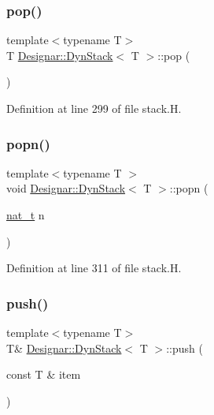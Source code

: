 \subsubsection{\texorpdfstring{pop()}{pop()}}
{\footnotesize\ttfamily template$<$typename T$>$ \\
T \hyperlink{class_designar_1_1_dyn_stack}{Designar\+::\+Dyn\+Stack}$<$ T $>$\+::pop (\begin{DoxyParamCaption}{ }\end{DoxyParamCaption})\hspace{0.3cm}{\ttfamily [inline]}}



Definition at line 299 of file stack.\+H.

\mbox{\label{class_designar_1_1_dyn_stack_a161b319e52448a4f824b036a9f7c6cca}} 
\subsubsection{\texorpdfstring{popn()}{popn()}}
{\footnotesize\ttfamily template$<$typename T $>$ \\
void \hyperlink{class_designar_1_1_dyn_stack}{Designar\+::\+Dyn\+Stack}$<$ T $>$\+::popn (\begin{DoxyParamCaption}\item[{\hyperlink{namespace_designar_aa72662848b9f4815e7bf31a7cf3e33d1}{nat\+\_\+t}}]{n }\end{DoxyParamCaption})}



Definition at line 311 of file stack.\+H.

\mbox{\label{class_designar_1_1_dyn_stack_a07d7d76d087e7b9dc287a7b2acd02fc6}} 
\subsubsection{\texorpdfstring{push()}{push()}\hspace{0.1cm}{\footnotesize\ttfamily [1/2]}}
{\footnotesize\ttfamily template$<$typename T$>$ \\
T\& \hyperlink{class_designar_1_1_dyn_stack}{Designar\+::\+Dyn\+Stack}$<$ T $>$\+::push (\begin{DoxyParamCaption}\item[{const T \&}]{item }\end{DoxyParamCaption})\hspace{0.3cm}{\ttfamily [inline]}}



